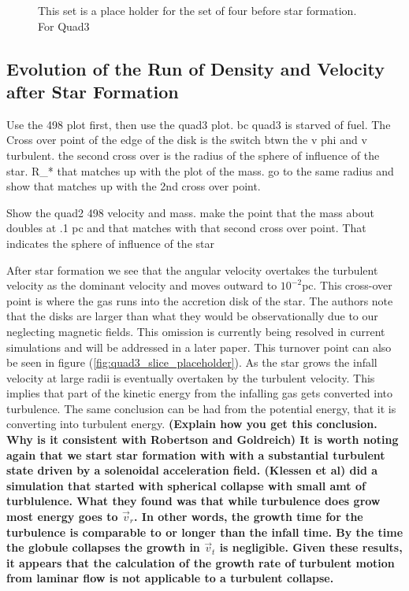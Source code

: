 \documentclass{emulateapj}
\begin{document}
\begin{figure}
\caption{This set is a place holder for the set of four before star formation. For Quad3
\label{fig:quad_000_four}}
\end{figure}


\subsection{Evolution of the Run of Density and Velocity after Star Formation}

Use the 498 plot first, then use the quad3 plot. bc quad3 is starved of fuel.
The Cross over point of the edge of the disk is the switch btwn the v phi and v turbulent. the second cross over is the radius of the sphere of influence of the star. R_{*} that matches up with the plot of the mass. go to the same radius and show that matches up with the 2nd cross over point.

Show the quad2 498 velocity and mass. make the point that the mass about doubles at .1 pc and that matches with that second cross over point. That indicates the sphere of influence of the star

After star formation we see that the angular velocity overtakes the turbulent velocity as the dominant velocity and moves outward to $10^{-2}$pc. This cross-over point is where the gas runs into the accretion disk of the star. The authors note that the disks are larger than what they would be observationally due to our neglecting magnetic fields. This omission is currently being resolved in current simulations and will be addressed in a later paper.
This turnover point can also be seen in figure (\ref{fig:quad3_slice_placeholder}). As the star grows the infall velocity at large radii is eventually overtaken by the turbulent velocity. This implies that part of the kinetic energy from the infalling gas gets converted into turbulence. The same conclusion can be had from the potential energy, that it is converting into turbulent energy. \bf(Explain how you get this conclusion. Why is it consistent with Robertson and Goldreich)
It is worth noting again that we start star formation with with a substantial turbulent state driven by a solenoidal acceleration field. \bf(Klessen et al)
did a simulation that started with spherical collapse with small amt of turblulence. What they found was that while turbulence does grow most energy goes to $\vec{v}_r$. In other words, the growth time for the turbulence is comparable to or longer than the infall time. By the time the globule collapses the growth in $\vec{v}_{t}$ is negligible.
Given these results, it appears that the calculation of the growth rate of turbulent motion from laminar flow is not applicable to a turbulent collapse.
\end{document}
